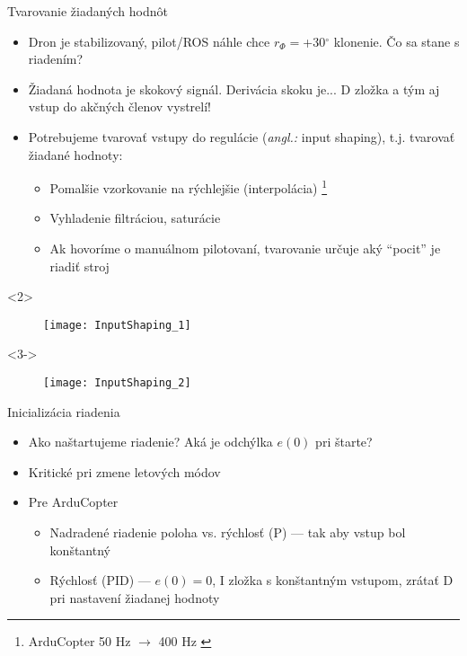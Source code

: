 \documentclass{beamer}
\newcommand{\angl}[1]{{\color{gray}(\emph{angl.:} #1)}}
\begin{document}
\begin{frame}[t]{Tvarovanie žiadaných hodnôt}
  \begin{itemize}
  \item<1-> Dron je stabilizovaný, pilot/ROS náhle chce $r_{\Phi}=$+30$^\circ$ klonenie. Čo sa stane s riadením?
  \item<2->  Žiadaná hodnota je skokový signál. Derivácia skoku je... D zložka a tým aj vstup do akčných členov vystrelí!
  \item<3->  Potrebujeme tvarovať vstupy do regulácie \angl{input shaping}, t.j. tvarovať žiadané hodnoty:
        \begin{itemize}
  \item Pomalšie vzorkovanie na rýchlejšie (interpolácia) \footnote{ArduCopter 50 Hz $\rightarrow$ 400 Hz \citep{AP:PID}}
  \item Vyhladenie filtráciou, saturácie
  \item<4-> Ak hovoríme o manuálnom pilotovaní, tvarovanie určuje aký ``pocit'' je riadiť stroj
  \end{itemize}
  \end{itemize}

        \begin{onlyenv}<2>
  \begin{figure}
\centering
  \texttt{[image: InputShaping\_1]}\\
\end{figure}
\end{onlyenv}


        \begin{onlyenv}<3->
  \begin{figure}
\centering
  \texttt{[image: InputShaping\_2]}\\
\end{figure}
\end{onlyenv}







\end{frame}

\begin{frame}[t]{Inicializácia riadenia}
\begin{itemize}
  \item<1-> Ako naštartujeme riadenie? Aká je odchýlka $e(0)$ pri štarte?
  \item<2-> Kritické pri zmene letových módov \citep{AP:PID,Bresciani2020}
  \item<3-> Pre ArduCopter \cite{AP:PID}
    \begin{itemize}
    \item Nadradené riadenie poloha vs. rýchlosť (P) --- tak aby vstup bol konštantný
    \item Rýchlosť (PID) --- $e(0)=0$, I zložka s konštantným vstupom, zrátať D pri nastavení žiadanej hodnoty
\end{itemize}

\end{itemize}
\end{frame}
\end{document}
